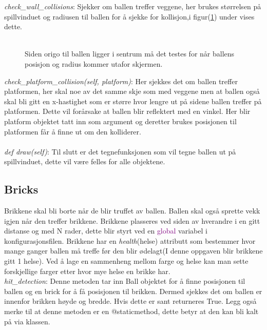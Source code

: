 \documentclass{article}     %
\begin{document}
\emph{check\_wall\_collisions}: Sjekker om ballen treffer veggene, her brukes størrelsen på spillvinduet og radiusen til ballen for å sjekke for kollisjon,i figur(\ref{ball}) under vises dette.\\\\
\begin{figure}[H]
\caption{Siden origo til ballen ligger i sentrum må det testes for når ballens posisjon og radius kommer utafor skjermen.}
\label{ball}
\end{figure}


\emph{check\_platform\_collision(self, platform)}: Her sjekkes det om ballen treffer platformen, her skal noe av det samme skje som med veggene men at ballen også skal bli gitt en x-hastighet som er større hvor lengre ut på sidene ballen treffer på platformen. Dette vil forårsake at ballen blir reflektert med en vinkel. Her blir platform objektet tatt inn som argument og deretter brukes posisjonen til platformen får å finne ut om den kolliderer.\\\\

\emph{def draw(self)}: Til slutt er det tegnefunksjonen som vil tegne ballen ut på spillvinduet, dette vil være felles for alle objektene.




\subsection{Bricks}

Brikkene skal bli borte når de blir truffet av ballen. Ballen skal også sprette vekk igjen når den treffer brikkene. Brikkene plasseres ved siden av hverandre i en gitt distanse og med N rader, dette blir styrt ved en \textcolor{purple}{global} variabel i konfigurasjonsfilen. Brikkene har en \emph{health}(helse) attributt som bestemmer hvor mange ganger ballen må treffe før den blir ødelagt(I denne oppgaven blir brikkene gitt 1 helse). Ved å lage en sammenheng mellom farge og helse kan man sette forskjellige farger etter hvor mye helse en brikke har.\\
\emph{hit\_detection}: Denne metoden tar inn Ball objektet for å finne posisjonen til ballen og en brick for å få posisjonen til brikken. Dermed sjekkes det om ballen er innenfor brikken høyde og bredde. Hvis dette er sant returneres True. Legg også merke til at denne metoden er en @staticmethod, dette betyr at den kan bli kalt på via klassen.\\\\
\end{document}
